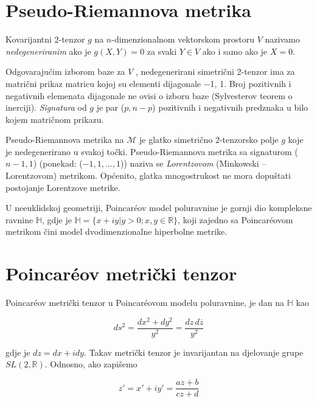 \section{Pseudo-Riemannova metrika}

Kovarijantni 2-tenzor $g$ na $n$-dimenzionalnom vektorskom prostoru $V$ nazivamo \textit{nedegeneriranim} ako je $g(X, Y) = 0$ za svaki $Y\in V$ ako i samo ako je $X = 0$.

\noindent Odgovarajućim izborom baze za $V$ , nedegenerirani simetrični 2-tenzor ima za matrični prikaz matricu kojoj su elementi dijagonale −1, 1. Broj pozitivnih i negativnih elemenata dijagonale ne ovisi o izboru baze (Sylvesterov teorem o inerciji). \textit{Signatura} od $g$ je par ($p,n−p$) pozitivnih i negativnih predznaka u bilo kojem matričnom prikazu.
\medskip

\noindent Pseudo-Riemannova metrika na $\mathcal{M}$ je glatko simetrično 2-tenzorsko polje $g$ koje je nedegenerirano u svakoj točki. Pseudo-Riemannova metrika sa signaturom ($n−1, 1$) (ponekad: ($−1, 1,\ldots, 1$)) naziva se \textit{Lorentzovom} (Minkowski – Lorentzovom) metrikom.
\noindent Općenito, glatka mnogostrukost ne mora dopuštati postojanje Lorentzove metrike.

\bigskip

\noindent U neeuklidskoj geometriji, Poincar\' eov model poluravnine je gornji dio kompleksne ravnine $\mathbb{H}$, gdje je $\mathbb{H} = \{x + iy| y > 0; x, y \in \mathbb{R} \}$, koji zajedno sa Poincar\' eovom metrikom čini model dvodimenzionalne hiperbolne metrike.

\newpage

\section{Poincar\' eov metrički tenzor}

\noindent Poincar\' eov metrički tenzor u Poincar\' eovom modelu poluravnine, je dan na $\mathbb{H}$ kao


\begin{equation}
ds^2=\frac{dx^2+dy^2}{y^2}=\frac{dz \, d\overline{z}}{y^2}
\label{eq:Poincaremet}
\end{equation}

\noindent gdje je $dz=dx+idy$. Takav metrički tenzor je invarijantan na djelovanje grupe $SL(2,\mathbb{R})$. Odnosno, ako zapišemo

\begin{equation*}
z'=x'+iy'=\frac{az+b}{cz+d}
\end{equation*}

